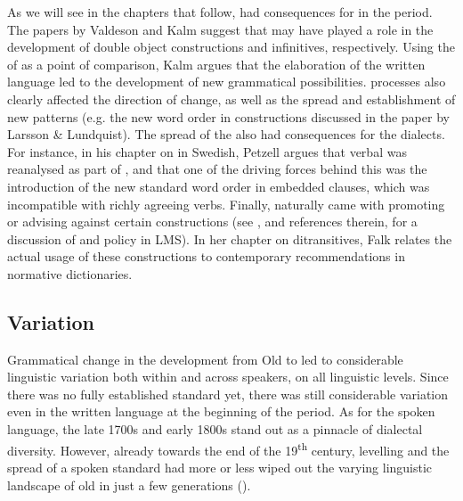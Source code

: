 \documentclass[output=paper]{langscibook}
\begin{document}
As we will see in the chapters that follow,  had consequences for  in the  period. The papers by Valdeson and Kalm suggest that  may have played a role in the development of double object constructions and  infinitives, respectively. Using the  of  as a point of comparison, Kalm argues that the elaboration of the written language led to the development of new grammatical possibilities.  processes also clearly affected the direction of change, as well as the spread and establishment of new patterns (e.g. the new word order in  constructions discussed in the paper by Larsson \& Lundquist). The spread of the  also had consequences for the dialects. For instance, in his chapter on  in  Swedish, Petzell argues that verbal  was reanalysed as part of , and that one of the driving forces behind this  was the introduction of the new standard word order in embedded clauses, which was incompatible with richly agreeing verbs. Finally,  naturally came with  promoting or advising against certain constructions (see \citealt{Teleman2002, Teleman2003Tradis}, and references therein, for a discussion of  and policy in LMS). In her chapter on  ditransitives, Falk relates the actual usage of these constructions to contemporary recommendations in normative dictionaries. 


\subsection{Variation}\label{sec:intro:2.2}


Grammatical change in the development from Old to  led to considerable linguistic variation both within and across speakers, on all linguistic levels. Since there was no fully established standard yet, there was still considerable variation even in the written language at the beginning of the  period. As for the spoken language, the late 1700s and early 1800s stand out as a pinnacle of dialectal diversity. However, already towards the end of the 19\textsuperscript{th} century,  levelling and the spread of a spoken standard had more or less wiped out the varying linguistic landscape of old in just a few generations (\citealt{NilssonPetzell2015}).
\end{document}
